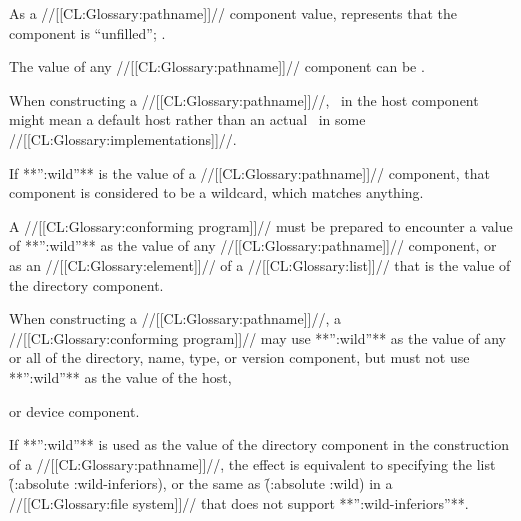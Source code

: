 \endsubsubsubsubsection%

\endsubsubsubsection%


\endsubsubsection%






As a //[[CL:Glossary:pathname]]// component value,
\nil represents that the component is ``unfilled'';
\seesection\MergingPathnames.

The value of any //[[CL:Glossary:pathname]]// component can be \nil.


When constructing a //[[CL:Glossary:pathname]]//,
\nil\ in the host component might mean a default host
rather than an actual \nil\ in some //[[CL:Glossary:implementations]]//.

\endsubsubsubsection%


If **'':wild''** is the value of a //[[CL:Glossary:pathname]]// component,
that component is considered to be a wildcard, which matches anything.

A //[[CL:Glossary:conforming program]]// must be prepared to encounter a value of **'':wild''**
as the value of any //[[CL:Glossary:pathname]]// component,
or as an //[[CL:Glossary:element]]// of a //[[CL:Glossary:list]]// that is the value of the directory component.

When constructing a //[[CL:Glossary:pathname]]//,
a //[[CL:Glossary:conforming program]]// may use **'':wild''** as the value of any or all of
the directory, name, type, 
or version component, but must not use **'':wild''** as the value of the host,



or device component.

If **'':wild''** is used as the value of the directory component in the construction
of a //[[CL:Glossary:pathname]]//, the effect is equivalent to specifying the list
\f{(:absolute :wild-inferiors)},
or the same as \f{(:absolute :wild)} in a //[[CL:Glossary:file system]]// that does not support
**'':wild-inferiors''**.


